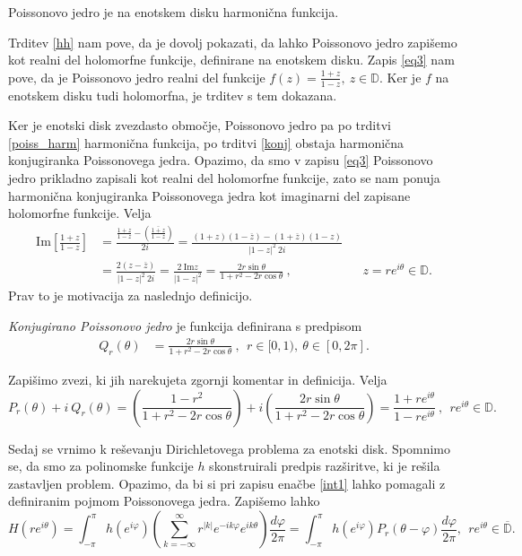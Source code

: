 \documentclass[mat1, tisk]{fmfdelo}
\begin{document}
    \begin{trditev}
        \label{poiss_harm}
        Poissonovo jedro je na enotskem disku harmonična funkcija. 
    \end{trditev}
    \begin{dokaz}
        Trditev \ref{hh} nam pove, da je dovolj pokazati, da lahko Poissonovo jedro zapišemo kot realni del holomorfne funkcije, definirane na enotskem disku.
        Zapis \eqref{eq3} nam pove, da je Poissonovo jedro realni del funkcije $f(z) = \frac{1 + z}{1 - z},~z \in \mathbb{D}$. Ker je $f$ na enotskem disku tudi holomorfna, je trditev s tem dokazana. 
    \end{dokaz}

    Ker je enotski disk zvezdasto območje, Poissonovo jedro pa po trditvi \ref{poiss_harm} harmonična funkcija, po trditvi \ref{konj} obstaja harmonična konjugiranka Poissonovega jedra. 
    Opazimo, da smo v zapisu \eqref{eq3} Poissonovo jedro prikladno zapisali kot realni del holomorfne funkcije, zato se nam ponuja harmonična konjugiranka Poissonovega jedra kot imaginarni del zapisane holomorfne funkcije.
    Velja
    \begin{align*}
        \text{Im}\left[\frac{1 + z}{1-z}\right] &= \frac{\frac{1 + z}{1-z} - \left(\overline{\frac{1 + z}{1-z}}\right)}{2i} = \frac{(1 + z)(1 - \overline{z}) - (1 + \overline{z})(1 - z)}{|1 - z|^2~2i} & & \\ 
        & = \frac{2 (z - \overline{z})}{|1 - z|^2~2i} = \frac{2~\text{Im}z}{|1 - z|^2} = \frac{2 r \sin\theta}{1+ r^2 - 2r \cos\theta}~, & & z = r e^{i\theta} \in \mathbb{D}.
    \end{align*}
    Prav to je motivacija za naslednjo definicijo. 
    \begin{definicija}
        \emph{Konjugirano Poissonovo jedro} je funkcija definirana s predpisom
        \begin{align}
            Q_r(\theta) & = \frac{2 r \sin\theta}{1+ r^2 - 2r \cos\theta}~,~~r \in [0,1),~\theta \in [0,2\pi].
        \end{align}
    \end{definicija}
    
    Zapišimo zvezi, ki jih narekujeta zgornji komentar in definicija. Velja
    $$
    P_r(\theta) + i~Q_r(\theta) = \left( \frac{1-r^2}{1+ r^2 - 2r \cos\theta}\right) + i \left(\frac{2 r \sin\theta}{1+ r^2 - 2r \cos\theta}\right) = \frac{1 + re^{i\theta}}{1 - re^{i\theta}}~,~~r e^{i\theta} \in \mathbb{D}.
    $$      

    Sedaj se vrnimo k reševanju Dirichletovega problema za enotski disk. 
    Spomnimo se, da smo za polinomske funkcije $h$ skonstruirali predpis razširitve, ki je rešila zastavljen problem. 
    Opazimo, da bi si pri zapisu enačbe \eqref{int1} lahko pomagali z definiranim pojmom Poissonovega jedra. Zapišemo lahko
    $$
    H(r e^{i \theta}) = \int_{-\pi}^{\pi}{h(e^{i \varphi}) \left(\sum_{k = - \infty}^{\infty} r^{|k|} e^{- i k \varphi} e^{i k \theta} \right)}\frac{d \varphi}{2 \pi} = 
    \int_{-\pi}^{\pi}{h(e^{i \varphi}) P_r(\theta - \varphi)\frac{d \varphi}{2 \pi}},~~r e^{i \theta} \in \overline{\mathbb{D}}.
    $$
\end{document}
